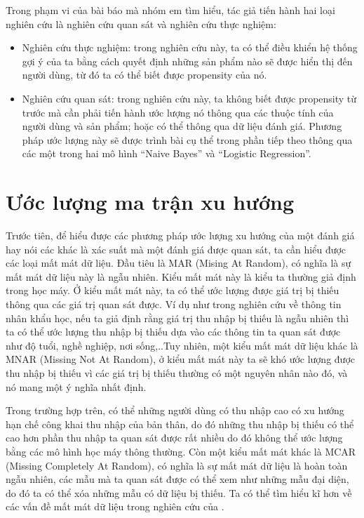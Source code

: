 Trong phạm vi của bài báo mà nhóm em tìm hiểu, tác giả tiến hành hai loại nghiên cứu là nghiên cứu quan sát và nghiên cứu thực nghiệm:
\begin{itemize}
    \item Nghiên cứu thực nghiệm: trong nghiên cứu này, ta có thể điều khiển hệ thống gợi ý của ta bằng cách quyết định những sản phẩm nào sẽ được hiển thị đến người dùng, từ đó ta có thể biết được propensity của nó.
    \item Nghiên cứu quan sát: trong nghiên cứu này, ta không biết được propensity từ trước mà cần phải tiến hành ước lượng nó thông qua các thuộc tính của người dùng và sản phẩm; hoặc có thể thông qua dữ liệu đánh giá. Phương pháp ước lượng này sẽ được trình bài cụ thể trong phần tiếp theo thông qua các một trong hai mô hình ``Naive Bayes'' và ``Logistic Regression''.
\end{itemize}
\section{Ước lượng ma trận xu hướng}
\label{sec:3_estimate}
Trước tiên, để hiểu được các phương pháp ước lượng xu hướng của một đánh giá hay nói các khác là xác suất mà một đánh giá được quan sát, ta cần hiểu được các loại mất mát dữ liệu. Đầu tiêu là MAR (Mising At Random), có nghĩa là sự mất mát dữ liệu này là ngẫu nhiên. Kiểu mất mát này là kiểu ta thường giả định trong học máy. Ở kiểu mất mát này, ta có thể ước lượng được giá trị bị thiếu thông qua các giá trị quan sát được. Ví dụ như trong nghiên cứu về thông tin nhân khẩu học, nếu ta giả định rằng giá trị thu nhập bị thiếu là ngẫu nhiên thì ta có thể ước lượng thu nhập bị thiếu dựa vào các thông tin ta quan sát được như độ tuổi, nghề nghiệp, nơi sống,..Tuy nhiên,  một kiểu mất mát dữ liệu khác là MNAR (Missing Not At Random), ở kiểu mất mát này ta sẽ khó ước lượng được thu nhập bị thiếu vì các giá trị bị thiếu thường có một nguyên nhân nào đó, và nó mang một ý nghĩa nhất định.

Trong trường hợp trên, có thể những người dùng có thu nhập cao có xu hướng hạn chế công khai thu nhập của bản thân, do đó những thu nhập bị thiếu có thể cao hơn phần thu nhập ta quan sát được rất nhiều do đó không thể ước lượng bằng các mô hình học máy thông thường. Còn một kiểu mất mát khác là MCAR (Missing Completely At Random), có nghĩa là sự mất mát dữ liệu là hoàn toàn ngẫu nhiên, các mẫu mà ta quan sát được có thể xem như những mẫu đại diện, do đó ta có thể xóa những mẫu có dữ liệu bị thiếu. Ta có thể tìm hiểu kĩ hơn về các vấn đề mất mát dữ liệu trong nghiên cứu của \cite{rubin_2002}.

